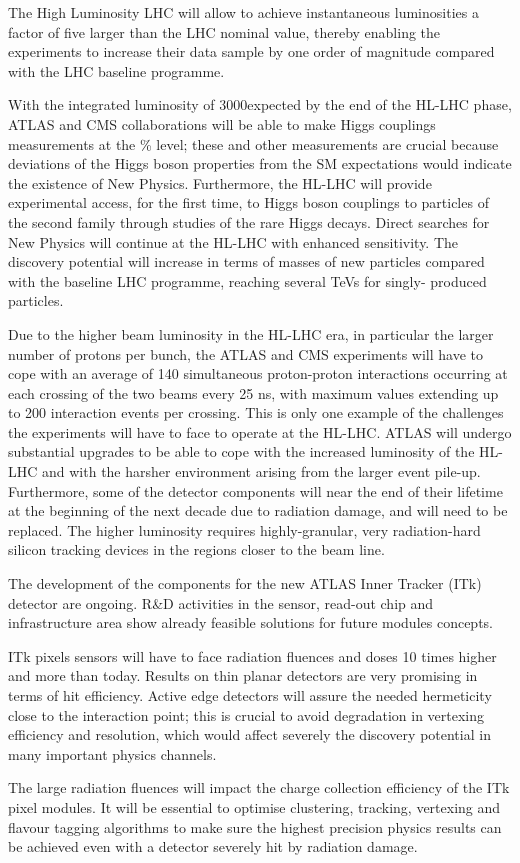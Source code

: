 The High Luminosity LHC will allow to achieve instantaneous luminosities a factor of five larger than the 
LHC nominal value, thereby enabling the experiments to increase their data sample by one order of 
magnitude compared with the LHC baseline programme.

With the integrated luminosity of 3000\invfb expected by the end of the HL-LHC phase, ATLAS and CMS 
collaborations will be able to make Higgs couplings measurements at the \% level; 
these and other measurements are crucial because deviations of the Higgs boson properties from the SM 
expectations would indicate the existence of New Physics. 
Furthermore, the HL-LHC will provide experimental access, for the first time, to Higgs boson couplings to particles of the second family through studies of the rare Higgs decays.
Direct searches for New Physics will continue at 
the HL-LHC with enhanced sensitivity. The discovery potential will increase  in terms of 
masses of new particles compared with the baseline LHC programme, reaching several TeVs for singly-
produced particles.

Due to the higher beam luminosity in the HL-LHC era, in particular the larger number of protons per bunch, 
the ATLAS and CMS experiments will have to cope with an average of 140 simultaneous proton-proton 
interactions occurring at each crossing of the two beams every 25 ns, with maximum 
values extending up to 200 interaction events per crossing. This is only one example of the challenges the 
experiments will have to face to operate at the HL-LHC.
 ATLAS  will undergo substantial upgrades to be able to cope with the increased luminosity of the HL-LHC 
and with the harsher environment arising from the larger event pile-up. Furthermore, some of the detector 
components will near the end of their lifetime at the beginning of the next decade due to radiation damage, 
and will need to be replaced. The higher luminosity  requires highly-granular, very radiation-hard silicon 
tracking devices in the regions closer to the beam line.


The development of the components for the new ATLAS Inner Tracker (ITk) detector are ongoing.
 R\&D activities in the sensor, read-out chip and infrastructure area show already feasible solutions for 
 future modules concepts.

ITk pixels sensors will have to face radiation fluences and doses 10 times higher and more than today. 
Results on thin planar detectors are very promising in terms of hit efficiency. Active edge detectors 
will assure the needed hermeticity close to the interaction point; this is crucial to avoid 
degradation in vertexing efficiency and resolution, which would affect severely the  
discovery potential in many important physics channels.

The large radiation fluences will impact the charge collection efficiency of the ITk pixel modules. 
It will be essential to optimise clustering, tracking, vertexing and flavour tagging algorithms to 
make sure the highest precision physics results can be achieved even with a detector severely hit 
by radiation damage. 

